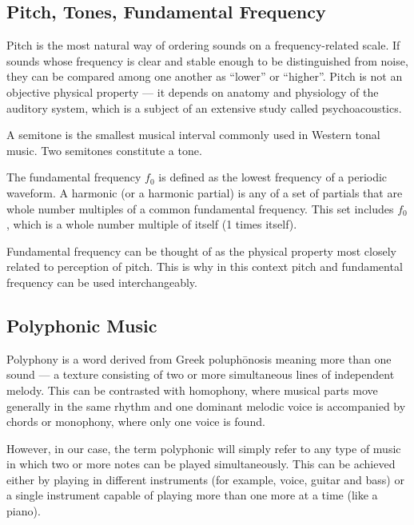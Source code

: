 \vspace{10pt}

\subsection{Pitch, Tones, Fundamental Frequency}

Pitch is the most natural way of ordering sounds on a frequency-related scale. If sounds whose frequency is clear and stable enough to be distinguished from noise, they can be compared among  one another as “lower” or “higher”. Pitch is not an objective physical property — it depends on anatomy and physiology of the auditory system, which is a subject of an extensive study called psychoacoustics. 

A semitone is the smallest musical interval commonly used in Western tonal music. Two semitones constitute a tone.

The fundamental frequency $f_{\text{0}}$ is defined as the lowest frequency of a periodic waveform. A harmonic (or a harmonic partial) is any of a set of partials that are whole number multiples of a common fundamental frequency. This set includes $f_{0}$, which is a whole number multiple of itself (1 times itself).

Fundamental frequency can be thought of as the physical property most closely related to perception of pitch. This is why in this context pitch and fundamental frequency can be used interchangeably.

\vspace{10pt}

\subsection{Polyphonic Music}

Polyphony is a word derived from Greek poluph\={o}nosis meaning more than one sound — a texture consisting of two or more simultaneous lines of independent melody. This can be contrasted with homophony, where musical parts move generally in the same rhythm and one dominant melodic voice is accompanied by chords or monophony, where only one voice is found. 

However, in our case, the term polyphonic will simply refer to any type of music in which two or more notes can be played simultaneously. This can be achieved either by playing in different instruments (for example, voice, guitar and bass) or a single instrument capable of playing more than one more at a time (like a piano).


